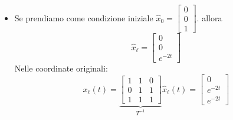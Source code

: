 \documentclass{article}
\begin{document}
\begin{itemize}
\item Se prendiamo come condizione iniziale $\hat x_0 = \begin{bmatrix} 0\\0\\1 \end{bmatrix}$. allora
\[
    \hat x_\ell = \begin{bmatrix} 0\\0\\e^{-2t} \end{bmatrix}
\]
Nelle coordinate originali:
\[
    x_\ell(t) = \underbrace{\begin{bmatrix}
        1&1&0\\
        0&1&1\\
        1&1&1
    \end{bmatrix} }_{T^{-1}} \hat x_\ell (t) = 
    \begin{bmatrix}
        0\\
        e^{-2t}\\
        e^{-2t}
    \end{bmatrix}
\]

\end{itemize}
\end{document}
